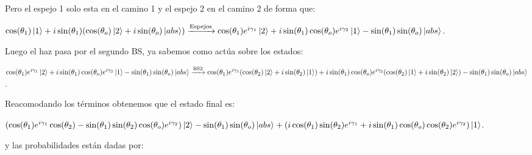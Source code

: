 \documentclass[11pt]{article}
\begin{document}
\vspace{0.3cm}

Pero el espejo 1 solo esta en el camino 1 y el espejo 2 en el camino 2 de forma que:

\vspace{0.3cm}

$\cos
(\theta_
{1})\ket
{1}+i\sin(\theta_
{1})(\cos
(\theta_
{o})\ket
{2}+i\sin(\theta_
{o})\ket
{abs
})\xrightarrow{\text{Espejos}}\cos(\theta_{1})e^{i\gamma_{1}}\ket{2}+i\sin(\theta_{1})\cos(\theta_{o})e^{i\gamma_{2}}\ket{1}-\sin(\theta_{1})\sin(\theta_{o})\ket{abs}$.

\vspace{0.3cm}

Luego el haz pasa por el segundo BS, ya sabemos como  actúa sobre los estados:

\vspace{0.3cm}

$\cos(\theta_{1})e^{i\gamma_{1}}\ket{2}+i\sin(\theta_{1})\cos(\theta_{o})e^{i\gamma_{2}}\ket{1}-\sin(\theta_{1})\sin(\theta_{o})\ket{abs}\xrightarrow{\text{BS2}}\cos(\theta_{1})e^{i\gamma_{1}}(\cos(\theta_{2})\ket{2}+i\sin(\theta_{2})\ket{1})+i\sin(\theta_{1})\cos(\theta_{o})e^{i\gamma_{2}}(\cos(\theta_{2})\ket{1}+i\sin(\theta_{2})\ket{2})-\sin(\theta_{1})\sin(\theta_{o})\ket{abs}$.

\vspace{0.3cm}

Reacomodando los términos obtenemos que el estado final es:

\vspace{0.3cm}

$(\cos(\theta_{1})e^{i\gamma_{1}}\cos(\theta_{2})-\sin(\theta_{1})\sin(\theta_{2})\cos(\theta_{o})e^{i\gamma_{2}})\ket{2}-\sin(\theta_{1})\sin(\theta_{o})\ket{abs}+(i\cos(\theta_{1})\sin(\theta_{2})e^{i\gamma_{1}}+i \sin(\theta_{1})\cos(\theta_{o})\cos(\theta_{2})e^{i\gamma_{2}})\ket{1}$.

\vspace{0.3cm}

y las probabilidades están dadas por:
\end{document}
